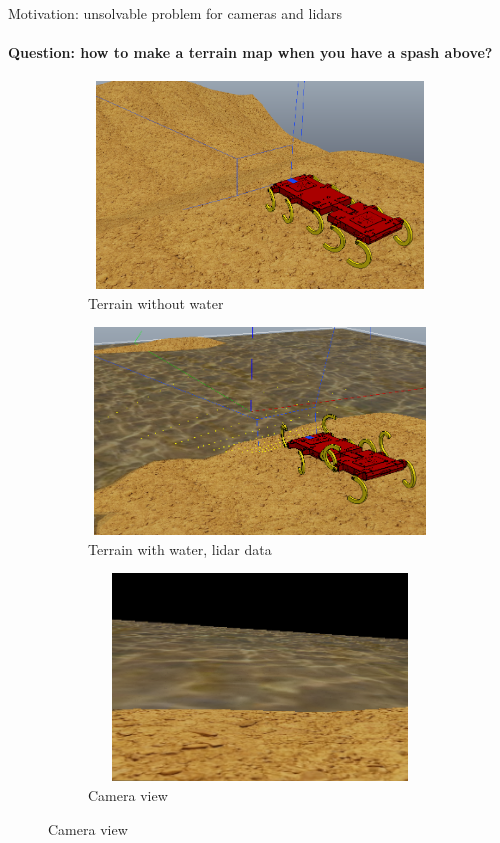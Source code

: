\documentclass[aspectratio=169]{beamer}
\begin{document}
\begin{frame}[t]{Motivation: unsolvable problem for cameras and lidars}
    \framesubtitle{Question: how to make a terrain map when you have a spash above?}
    \begin{figure}[H]
        \begin{subfigure}{0.32\textwidth}
            \centering\includegraphics[height=5.5cm,width=1\textwidth,keepaspectratio]{terrain_wo_water.png}
            \caption*{Terrain without water}
        \end{subfigure}
        \hfill
        \begin{subfigure}{0.32\textwidth}
            \centering\includegraphics[height=5.5cm,width=1\textwidth,keepaspectratio]{terrain_w_water1.png}
            \caption*{Terrain with water, lidar data}
        \end{subfigure}
        \hfill
        \begin{subfigure}{0.32\textwidth}
            \centering\includegraphics[height=5.5cm,width=1\textwidth,keepaspectratio]{terrain_w_water_camera.png}
            \caption*{Camera view}
        \end{subfigure}
        \hfill
    \end{figure}
\end{frame}
\end{document}
